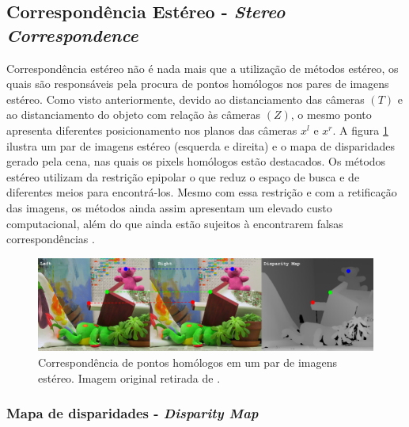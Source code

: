\subsection{Correspondência Estéreo - \textit{Stereo Correspondence}}

Correspondência estéreo não é nada mais que a utilização de métodos estéreo, os quais são responsáveis pela procura de pontos homólogos nos pares de imagens estéreo. Como visto anteriormente, devido ao distanciamento das câmeras $(T)$ e ao distanciamento do objeto com relação às câmeras $(Z)$, o mesmo ponto apresenta diferentes posicionamento nos planos das câmeras $x^l$ e $x^r$. A figura \ref{homologous_points _stereo} ilustra um par de imagens estéreo (esquerda e direita) e o mapa de disparidades gerado pela cena, nas quais os pixels homólogos estão destacados. Os métodos estéreo utilizam da restrição epipolar o que reduz o espaço de busca e de diferentes meios para encontrá-los. Mesmo com essa restrição e com a retificação das imagens, os métodos ainda assim apresentam um elevado custo computacional, além do que ainda estão sujeitos à encontrarem falsas correspondências \cite{Wang2007}. 

\begin{figure}[H]
 	\centering
 	\includegraphics[scale=0.33]{./Resources/homologous_points_stereo.png}
 	\caption{Correspondência de pontos homólogos em um par de imagens estéreo. Imagem original retirada de \cite{Scharstein2003}.}
 	\label{homologous_points _stereo}
\end{figure}


\subsubsection{Mapa de disparidades - \textit{Disparity Map}}


